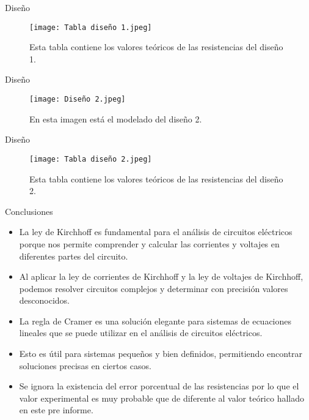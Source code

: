 \documentclass[svgnames, aspectratio=169]{beamer}
\begin{document}
\begin{frame}{Diseño}

\begin{figure}[h]
    \centering
    \texttt{[image: Tabla diseño 1.jpeg]}
    \caption{Esta tabla contiene los valores teóricos de las resistencias del diseño 1.}
\end{figure}

\end{frame}

\begin{frame}{Diseño}

\begin{figure}[h]
    \centering
    \texttt{[image: Diseño 2.jpeg]}
    \caption{En esta imagen está el modelado del diseño 2.}
\end{figure}

\end{frame}

\begin{frame}{Diseño}

\begin{figure}[h]
    \centering
    \texttt{[image: Tabla diseño 2.jpeg]}
    \caption{Esta tabla contiene los valores teóricos de las resistencias del diseño 2.}
\end{figure}

\end{frame}

\begin{frame}{Conclusiones}
\begin{itemize}
    \item La ley de Kirchhoff es fundamental para el análisis de circuitos eléctricos porque nos permite comprender y calcular las corrientes y voltajes en diferentes partes del circuito.

\item  Al aplicar la ley de corrientes de Kirchhoff y la ley de voltajes de Kirchhoff, podemos resolver circuitos complejos y determinar con precisión valores desconocidos.
\item La regla de Cramer es una solución elegante para sistemas de ecuaciones lineales que se puede utilizar en el análisis de circuitos eléctricos.

\item  Esto es útil para sistemas pequeños y bien definidos, permitiendo encontrar soluciones precisas en ciertos casos.
\item Se ignora la existencia del error porcentual de las resistencias por lo que el valor experimental es muy probable que de diferente al valor teórico hallado en este pre informe.
\end{itemize}
\end{frame}
\end{document}
